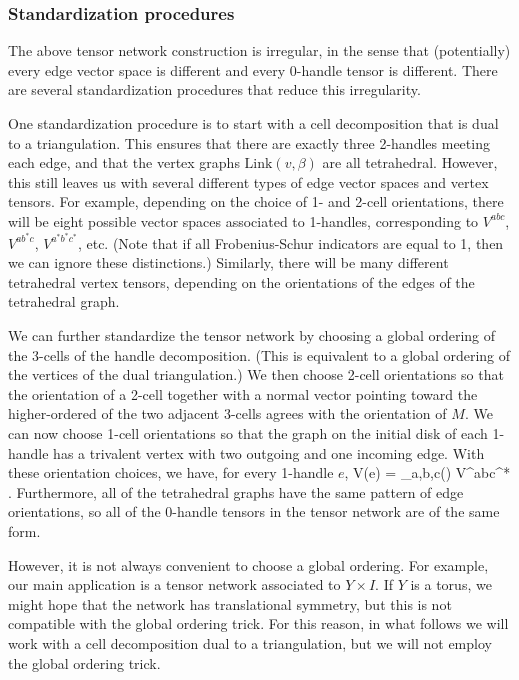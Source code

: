 \subsubsection{Standardization procedures} \label{bosonic_standardization} 

The above tensor network construction is irregular, in the sense that (potentially) every edge vector space is different 
and every 0-handle tensor is different.
There are several standardization procedures that reduce this irregularity. 

One standardization procedure is to start with a cell decomposition that is dual to a triangulation.
This ensures that there are exactly three 2-handles meeting each edge, and that the vertex graphs $\text{Link}(v,\beta)$ are all tetrahedral.
However, this still leaves us with several different types of edge vector spaces and vertex tensors.
For example, depending on the choice of 1- and 2-cell orientations, there will be eight possible vector spaces associated to 1-handles,
corresponding to $V^{abc}$, $V^{ab^*c}$, $V^{a^*b^*c^*}$, etc.
(Note that if all Frobenius-Schur indicators are equal to 1, then we can ignore these distinctions.)
Similarly, there will be many different tetrahedral vertex tensors, depending on the orientations of the edges of the tetrahedral graph.

We can further standardize the tensor network by choosing a global ordering of the 3-cells of the handle decomposition.
(This is equivalent to a global ordering of the vertices of the dual triangulation.)
We then choose 2-cell orientations so that the orientation of a 2-cell together with a normal vector pointing toward the higher-ordered of the two
adjacent 3-cells agrees with the orientation of $M$.
We can now choose 1-cell orientations so that the graph on the initial disk of each 1-handle has a trivalent vertex with two
outgoing and one incoming edge.
With these orientation choices, we have, for every 1-handle $e$,
\be
	V(e) = \bigoplus_{a,b,c\in\sob(\mcc)} V^{abc^*} .
\ee
Furthermore, all of the tetrahedral graphs have the same pattern of edge orientations, so all of the 0-handle tensors
in the tensor network are of the same form. 

However, it is not always convenient to choose a global ordering.
For example, our main application is a tensor network associated to $Y\times I$.
If $Y$ is a torus, we might hope that the network has translational symmetry, but this is not compatible with the global ordering trick.
For this reason, in what follows we will work with a cell decomposition dual to a triangulation, but we will not employ the global ordering trick.

